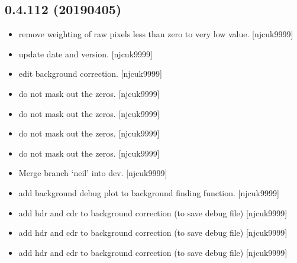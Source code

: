 \documentclass[a4paper,10pt,english]{report}
\begin{document}
\subsection{0.4.112 (2019\sphinxhyphen{}04\sphinxhyphen{}05)}
\label{\detokenize{misc/changelog:id168}}\begin{itemize}
\item {} 
 \sphinxhyphen{} remove weighting of raw pixels less than zero to very
low value. {[}njcuk9999{]}

\item {} 
 \sphinxhyphen{} update date and version. {[}njcuk9999{]}

\item {} 
 \sphinxhyphen{} edit background correction. {[}njcuk9999{]}

\item {} 
 \sphinxhyphen{} do not mask out the zeros. {[}njcuk9999{]}

\item {} 
 \sphinxhyphen{} do not mask out the zeros. {[}njcuk9999{]}

\item {} 
 \sphinxhyphen{} do not mask out the zeros. {[}njcuk9999{]}

\item {} 
 \sphinxhyphen{} do not mask out the zeros. {[}njcuk9999{]}

\item {} 
Merge branch ‘neil’ into dev. {[}njcuk9999{]}

\item {} 
 \sphinxhyphen{} add background debug plot to background finding
function. {[}njcuk9999{]}

\item {} 
 \sphinxhyphen{} add hdr and cdr to background correction (to save
debug file) {[}njcuk9999{]}

\item {} 
 \sphinxhyphen{} add hdr and cdr to background correction (to
save debug file) {[}njcuk9999{]}

\item {} 
 \sphinxhyphen{} add hdr and cdr to background correction
(to save debug file) {[}njcuk9999{]}


\end{itemize}
\end{document}
